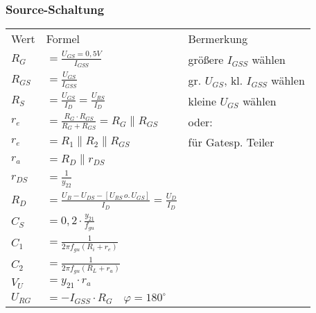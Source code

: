     \subsubsection{Source-Schaltung}
        \begin{minipage}{0.5\columnwidth}
            \renewcommand{\arraystretch}{1.01}
            \begin{table}[H]
                \begin{tabularx}{\columnwidth}{l l l}
                    Wert     & Formel                                                           & Bermerkung\\
                    $R_G$    & $=\frac{U_{GS}=0,5V}{I_{GSS}}$                                   & größere $I_{GSS}$ wählen \\
                    $R_{GS}$ & $=\frac{U_{GS}}{I_{GSS}}$                                        & gr. $U_{GS}$, kl. $I_{GSS}$ wählen \\
                    $R_S$    & $=\frac{U_{GS}}{I_D}=\frac{U_{RS}}{I_D}$                         & kleine $U_{GS}$ wählen \\
                    $r_e$    & $=\frac{R_G\cdot R_{GS}}{R_G+R_{GS}}=R_G\parallel R_{GS}$        & oder:\\
                    $r_e$    & $=R_1\parallel R_2\parallel R_{GS}$                              & für Gatesp. Teiler \\
                    $r_a$    & $=R_D\parallel r_{DS}$                                           & \\
                    $r_{DS}$ & $=\frac{1}{y_{22}}$                                              & \\
                    $R_D$    & $=\frac{U_B-U_{DS}-[U_{RS}\, o.\, U_{GS}]}{I_D}=\frac{U_D}{I_D}$ & \\
                    $C_S$    & $=0,2\cdot\frac{y_{21}}{f_{gu}}$                                 & \\ %
                    $C_1$    & $=\frac{1}{2\pi f_{gu}(R_i+r_e)}$                                & \\
                    $C_2$    & $=\frac{1}{2\pi f_{gu}(R_L+r_a)}$                                & \\
                    $V_U$    & $=y_{21}\cdot r_a$                                               & \\
                    $U_{RG}$ & $=-I_{GSS}\cdot R_G\quad\varphi=180^{\circ}$                     & \\ %
                \end{tabularx}
            \end{table}
        \end{minipage}
        \begin{minipage}{0.5\columnwidth}
            \vspace*{6cm}
        \end{minipage}
